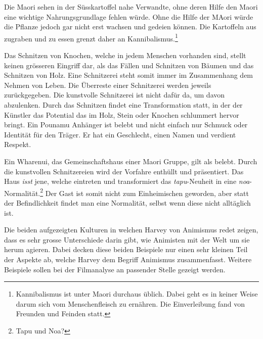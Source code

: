 Die Maori sehen in der Süsskartoffel nahe Verwandte, ohne deren Hilfe den Maori eine wichtige Nahrungsgrundlage fehlen würde. Ohne die Hilfe der MAori würde die Pflanze jedoch gar nicht erst wachsen und gedeien können. Die Kartoffeln aus zugraben und zu essen grenzt daher an Kannibalismus.\footnote{Kannibalismus ist unter Maori durchaus üblich. Dabei geht es in keiner Weise darum sich vom Menschenfleisch zu ernähren. Die Einverleibung fand von Freunden und Feinden statt.}

Das Schnitzen von Knochen, welche in jedem Menschen vorhanden sind, stellt keinen grösseren Eingriff dar, als das Fällen und Schnitzen von Bäumen und das Schnitzen von Holz. Eine Schnitzerei steht somit immer im Zusammenhang dem Nehmen von Leben. Die Überreste einer Schnitzerei werden jeweils zurückgegeben. Die kunstvolle Schnitzerei ist nicht dafür da, um davon abzulenken. Durch das Schnitzen findet eine Transformation statt, in der der Künstler das Potential das im Holz, Stein oder Knochen schlummert hervor bringt. Ein Pounamu Anhänger ist belebt und nicht einfach nur Schmuck oder Identität für den Träger. Er hat ein Geschlecht, einen Namen und verdient Respekt. 

Ein Wharenui, das Gemeinschaftshaus einer Maori Gruppe, gilt als belebt. Durch die kunstvollen Schnitzereien wird der Vorfahre enthüllt und präsentiert. Das Haus \emph{isst} jene, welche eintreten und transformiert das \emph{tapu}-Neuheit in eine \emph{noa}-Normalität.\footnote{Tapu und Noa?} Der Gast ist somit nicht zum Einheimischen geworden, aber statt der Befindlichkeit findet man eine Normalität, selbst wenn diese nicht alltäglich ist. 

\smallskip
Die beiden aufgezeigten Kulturen in welchen Harvey von Animismus redet zeigen, dass es sehr grosse Unterschiede darin gibt, wie Animisten mit der Welt um sie herum agieren. Dabei decken diese beiden Beispiele nur einen sehr kleinen Teil der Aspekte ab, welche Harvey dem Begriff Animismus zusammenfasst. Weitere Beispiele sollen bei der Filmanalyse an passender Stelle gezeigt werden.




